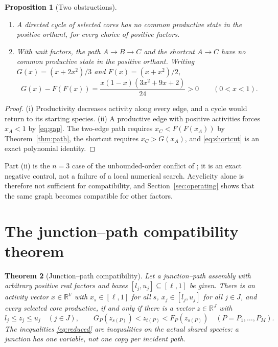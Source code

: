 \documentclass[11pt,a4paper]{article}
\theoremstyle{plain}
\newtheorem{theorem}{Theorem}[section]
\newtheorem{proposition}[theorem]{Proposition}
\theoremstyle{definition}
\theoremstyle{remark}
\newcommand{\R}{\mathbb{R}}
\begin{document}
\begin{proposition}[Two obstructions]\label{prop:obstructions}
\leavevmode
\begin{enumerate}[label=(\roman*)]
\item A directed cycle of selected cores has no common productive state in the positive orthant, for every choice of positive factors.
\item With unit factors, the path $A\to B\to C$ and the shortcut $A\to C$ have no common productive state in the positive orthant. Writing $G(x)=(x+2x^2)/3$ and $F(x)=(x+x^2)/2$,
\begin{equation}\label{eq:shortcut}
  G(x)-F(F(x))=\frac{x(1-x)(3x^2+9x+2)}{24}>0\qquad(0<x<1).
\end{equation}
\end{enumerate}
\end{proposition}

\begin{proof}
(i) Productivity decreases activity along every edge, and a cycle would return to its starting species. (ii) A productive edge with positive activities forces $x_A<1$ by \eqref{eq:gap}. The two-edge path requires $x_C<F(F(x_A))$ by Theorem~\ref{thm:path}, the shortcut requires $x_C>G(x_A)$, and \eqref{eq:shortcut} is an exact polynomial identity.
\end{proof}

Part (ii) is the $n=3$ case of the unbounded-order conflict of \citep{tcch2026}; it is an exact negative control, not a failure of a local numerical search. Acyclicity alone is therefore not sufficient for compatibility, and Section~\ref{sec:operating} shows that the same graph becomes compatible for other factors.

\section{The junction--path compatibility theorem}\label{sec:assembly}

\begin{theorem}[Junction--path compatibility]\label{thm:main}
Let a junction--path assembly with arbitrary positive real factors and boxes $[l_j,u_j]\subseteq[\ell,1]$ be given. There is an activity vector $x\in\R^V$ with $x_s\in[\ell,1]$ for all $s$, $x_j\in[l_j,u_j]$ for all $j\in J$, and every selected core productive, if and only if there is a vector $z\in\R^J$ with
\begin{equation}\label{eq:reduced}
  l_j\le z_j\le u_j\quad(j\in J),\qquad G_P(z_{s(P)})<z_{t(P)}<F_P(z_{s(P)})\quad(P=P_1,\dots,P_M).
\end{equation}
The inequalities \eqref{eq:reduced} are inequalities on the actual shared species: a junction has one variable, not one copy per incident path.
\end{theorem}
\end{document}
